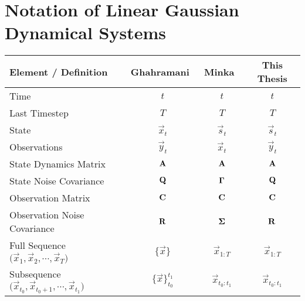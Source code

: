 \section{Notation of Linear Gaussian Dynamical Systems}



\begin{table}[ht]
	\centering
	\begin{tabular}{l|ccc}
		\textbf{Element / Definition} & \textbf{Ghahramani}~\cite{ghahramaniParameterEstimationLinear1996} & \textbf{Minka}~\cite{minkaHiddenMarkovModels1999} & \textbf{This Thesis} \\ \hline
		Time                         & \( t \)                         & \( t \)                 & \( t \)                                                    \\
		Last Timestep                & \( T \)                         & \( T \)                 & \( T \)                                                    \\
		State                        & \( \vec{x}_t \)                 & \( \vec{s}_t \)         & \( \vec{s}_t \)                                            \\
		Observations                 & \( \vec{y}_t \)                 & \( \vec{x}_t \)         & \( \vec{y}_t \)                                            \\
		State Dynamics Matrix        & \( \boldsymbol{\mathrm{A}} \)                   & \( \boldsymbol{\mathrm{A}} \)           & \( \boldsymbol{\mathrm{A}} \)                                              \\
		State Noise Covariance       & \( \boldsymbol{\mathrm{Q}} \)                   & \( \boldsymbol{\mathrm{\Gamma}} \)      & \( \boldsymbol{\mathrm{Q}} \)                                              \\
		Observation Matrix           & \( \boldsymbol{\mathrm{C}} \)                   & \( \boldsymbol{\mathrm{C}} \)           & \( \boldsymbol{\mathrm{C}} \)                                              \\
		Observation Noise Covariance & \( \boldsymbol{\mathrm{R}} \)                   & \( \boldsymbol{\mathrm{\Sigma}} \)      & \( \boldsymbol{\mathrm{R}} \)                                              \\
		Full Sequence \( \big( \vec{x}_1, \vec{x}_2, \cdots, \vec{x}_T \big) \)
		                             & \( \{ \vec{x} \} \)             & \( \vec{x}_{1:T} \)     & \( \vec{x}_{1:T} \)                                        \\
		Subsequence \( \big( \vec{x}_{t_0}, \vec{x}_{t_0 + 1}, \cdots, \vec{x}_{t_1} \big) \)
		                             & \( \{ \vec{x} \}_{t_0}^{t_1} \) & \( \vec{x}_{t_0:t_1} \) & \( \vec{x}_{t_0:t_1} \)                                    \\

\end{tabular}
\end{table}
